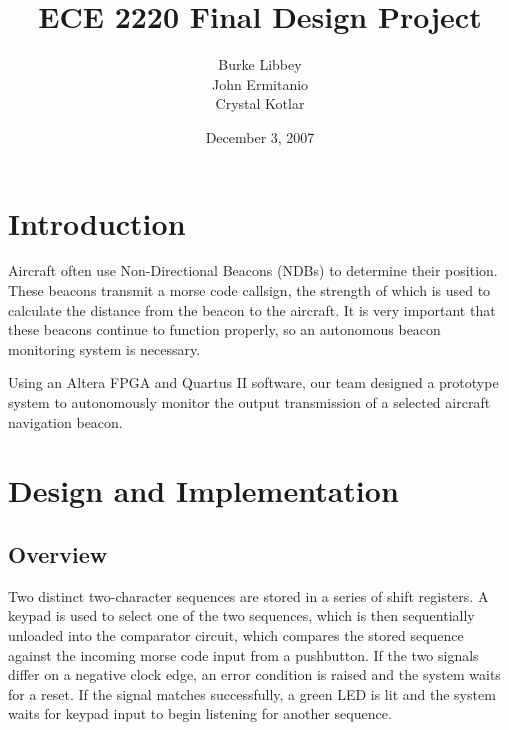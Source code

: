 \documentclass[11pt,letterpaper,titlepage]{article}
\begin{document}

\title{ECE 2220 Final Design Project}
\author{Burke Libbey \\ John Ermitanio \\ Crystal Kotlar}
\date{December 3, 2007}
\maketitle


\tableofcontents
\listoffigures
\newpage


\section{Introduction}

Aircraft often use Non-Directional Beacons (NDBs) to determine their position. These beacons transmit a morse code callsign, the strength of which is used to calculate the distance from the beacon to the aircraft. It is very important that these beacons continue to function properly, so an autonomous beacon monitoring system is necessary.

Using an Altera FPGA and Quartus II software, our team designed a prototype system to autonomously monitor the output transmission of a selected aircraft navigation beacon.


\section{Design and Implementation}
\subsection{Overview}

Two distinct two-character sequences are stored in a series of shift registers. A keypad is used to select one of the two sequences, which is then sequentially unloaded into the comparator circuit, which compares the stored sequence against the incoming morse code input from a pushbutton. If the two signals differ on a negative clock edge, an error condition is raised and the system waits for a reset. If the signal matches successfully, a green LED is lit and the system waits for keypad input to begin listening for another sequence.
\end{document}
